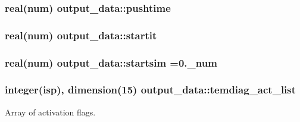\subsubsection[{\texorpdfstring{pushtime}{pushtime}}]{\setlength{\rightskip}{0pt plus 5cm}real(num) output\+\_\+data\+::pushtime}\hypertarget{namespaceoutput__data_a1616b369a6e32a80c9448bff6371d1cf}{}\label{namespaceoutput__data_a1616b369a6e32a80c9448bff6371d1cf}
\subsubsection[{\texorpdfstring{startit}{startit}}]{\setlength{\rightskip}{0pt plus 5cm}real(num) output\+\_\+data\+::startit}\hypertarget{namespaceoutput__data_a41d55c93b7330583e6a58d151f8d187b}{}\label{namespaceoutput__data_a41d55c93b7330583e6a58d151f8d187b}
\subsubsection[{\texorpdfstring{startsim}{startsim}}]{\setlength{\rightskip}{0pt plus 5cm}real(num) output\+\_\+data\+::startsim =0.\+\_\+num}\hypertarget{namespaceoutput__data_a3eebf5510f6656fe8385302d2aba28d5}{}\label{namespaceoutput__data_a3eebf5510f6656fe8385302d2aba28d5}
\subsubsection[{\texorpdfstring{temdiag\+\_\+act\+\_\+list}{temdiag_act_list}}]{\setlength{\rightskip}{0pt plus 5cm}integer(isp), dimension(15) output\+\_\+data\+::temdiag\+\_\+act\+\_\+list}\hypertarget{namespaceoutput__data_a8343f9b523163c47d0661619374f3455}{}\label{namespaceoutput__data_a8343f9b523163c47d0661619374f3455}


Array of activation flags. 

